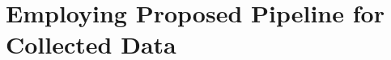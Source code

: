 \chapter{Employing Proposed Pipeline for Collected Data}\label{section:employing-proposed-pipeline}
